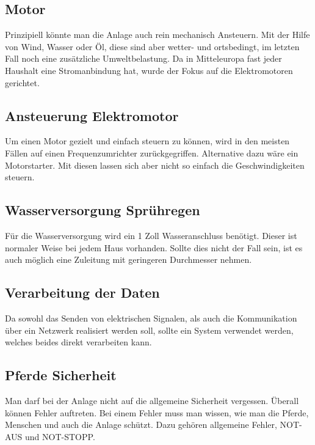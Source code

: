 \documentclass[12pt]{scrreprt} %
\begin{document}
\subsection{Motor}
\label{sec:motor}

Prinzipiell könnte man die Anlage auch rein mechanisch Ansteuern. Mit der Hilfe von Wind, Wasser oder Öl, diese sind aber wetter- und ortsbedingt, im letzten Fall noch eine zusätzliche Umweltbelastung. Da in Mitteleuropa fast jeder Haushalt eine Stromanbindung hat, wurde der Fokus auf die Elektromotoren gerichtet.

\subsection{Ansteuerung Elektromotor}
\label{sec:ansteuerungElektromotor}

Um einen Motor gezielt und einfach steuern zu können, wird in den meisten Fällen auf einen Frequenzumrichter zurückgegriffen. Alternative dazu wäre ein Motorstarter. Mit diesen lassen sich aber nicht so einfach die Geschwindigkeiten steuern.

\subsection{Wasserversorgung Sprühregen}
\label{sec:wasserversorgungSpruehregen}

Für die Wasserversorgung wird ein 1 Zoll Wasseranschluss benötigt. Dieser ist normaler Weise bei jedem Haus vorhanden. 
Sollte dies nicht der Fall sein, ist es auch möglich eine Zuleitung mit geringeren Durchmesser nehmen.

\subsection{Verarbeitung der Daten}
\label{sec:verarbeitungDerDaten}

Da sowohl das Senden von elektrischen Signalen, als auch die Kommunikation über ein Netzwerk realisiert werden soll, sollte ein System verwendet werden, welches beides direkt verarbeiten kann. 

\subsection{Pferde Sicherheit}
\label{sec:pferdeSicherheit}

Man darf bei der Anlage nicht auf die allgemeine Sicherheit vergessen. Überall können Fehler auftreten. Bei einem Fehler muss man wissen, wie man die Pferde, Menschen und auch die Anlage schützt. Dazu gehören allgemeine Fehler, NOT-AUS und NOT-STOPP.
\newpage
\end{document}
